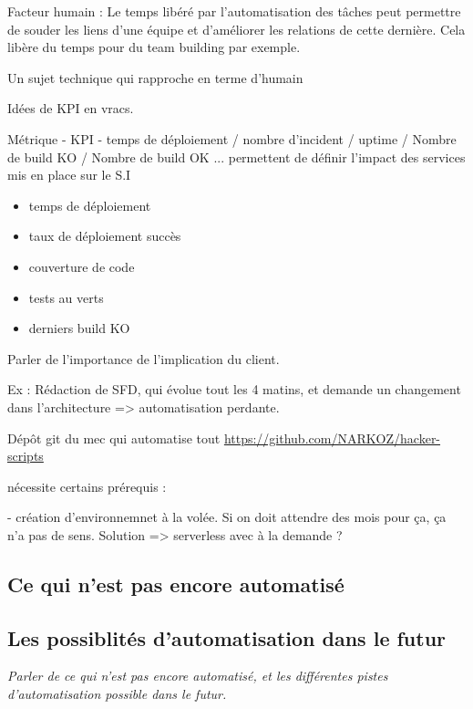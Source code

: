 Facteur humain : Le temps libéré par l'automatisation des tâches peut permettre de souder les liens d'une équipe et d'améliorer les relations de cette dernière. Cela libère du temps pour du team building par exemple.

Un sujet technique qui rapproche en terme d'humain

Idées de \gls{KPI} en vracs.

Métrique - KPI - temps de déploiement / nombre d'incident / uptime / Nombre de build KO / Nombre de build OK ... permettent de définir l'impact des services mis en place sur le S.I

\begin{itemize}
	\item temps de déploiement
	\item taux de déploiement succès
	\item couverture de code
	\item tests au verts
	\item derniers build KO
\end{itemize}

Parler de l'importance de l'implication du client. 

Ex :  Rédaction de SFD, qui évolue tout les 4 matins, et demande un changement dans l'architecture => automatisation perdante.

Dépôt git du mec qui automatise tout \url{https://github.com/NARKOZ/hacker-scripts}

nécessite certains prérequis : 



- création d'environnemnet à la volée. Si on doit attendre des mois pour ça, ça n'a pas de sens. Solution => serverless avec à la demande ? 

\subsection*{Ce qui n'est pas encore automatisé}

\subsection*{Les possiblités d'automatisation dans le futur}

\textit{Parler de ce qui n'est pas encore automatisé, et les différentes pistes d'automatisation possible dans le futur.}


